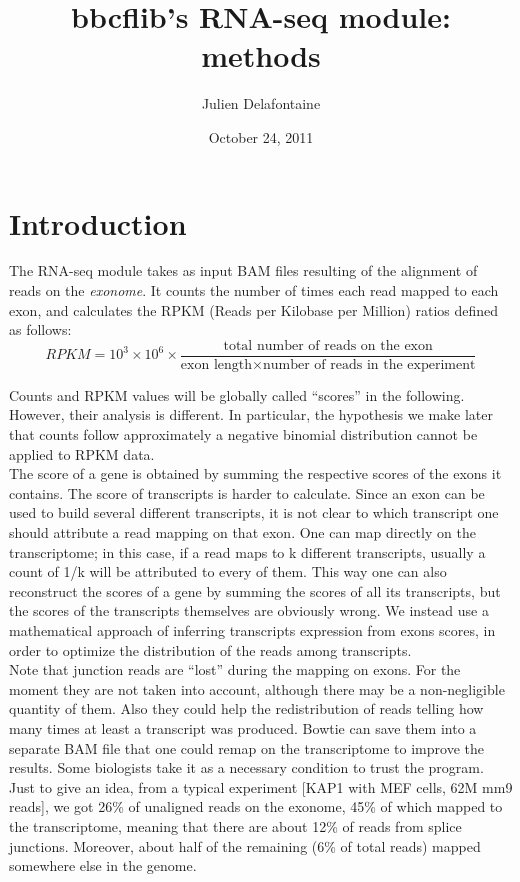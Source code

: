 \documentclass[a4paper,11pt]{article}
\title{bbcflib's RNA-seq module: methods}
\date{October 24, 2011}
\author{Julien Delafontaine}
\begin{document}
\maketitle

\section{Introduction}

The RNA-seq module takes as input BAM files resulting of the alignment of reads on the \emph{exonome}. It counts the number of times each read mapped to each exon, and calculates the RPKM (Reads per Kilobase per Million) ratios defined as follows:
$$ RPKM = 10^3 \times 10^6 \times \frac{\text{total number of reads on the exon}}{\text{exon length}\times\text{number of reads in the experiment}} $$

Counts and RPKM values will be globally called ``scores'' in the following. However, their analysis is different. In particular, the hypothesis we make later that counts follow approximately a negative binomial distribution cannot be applied to RPKM data. 
\\

The score of a gene is obtained by summing the respective scores of the exons it contains. The score of transcripts is harder to calculate. Since an exon can be used to build several different transcripts, it is not clear to which transcript one should attribute a read mapping on that exon. One can map directly on the transcriptome; in this case, if a read maps to k different transcripts, usually a count of 1/k will be attributed to every of them. This way one can also reconstruct the scores of a gene by summing the scores of all its transcripts, but the scores of the transcripts themselves are obviously wrong. We instead use a mathematical approach of inferring transcripts expression from exons scores, in order to optimize the distribution of the reads among transcripts.
\\

Note that junction reads are ``lost'' during the mapping on exons. For the moment they are not taken into account, although there may be a non-negligible quantity of them. Also they could help the redistribution of reads telling how many times at least a transcript was produced. Bowtie can save them into a separate BAM file that one could remap on the transcriptome to improve the results. Some biologists take it as a necessary condition to trust the program. Just to give an idea, from a typical experiment [KAP1 with MEF cells, 62M mm9 reads], we got 26\% of unaligned reads on the exonome, 45\% of which mapped to the transcriptome, meaning that there are about 12\% of reads from splice junctions. Moreover, about half of the remaining (6\% of total reads) mapped somewhere else in the genome.
\\
\end{document}
